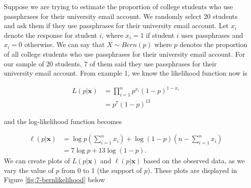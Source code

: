\documentclass[
]{book}
\begin{document}
Suppose we are trying to estimate the proportion of college students who use passphrases for their university email account. We randomly select 20 students and ask them if they use passphrases for their university email account. Let \(x_i\) denote the response for student \(i\), where \(x_i = 1\) if student \(i\) uses passphrases and \(x_i=0\) otherwise. We can say that \(X \sim Bern(p)\) where \(p\) denotes the proportion of all college students who use passphrases for their university email account. For our sample of 20 students, 7 of them said they use passphrases for their university email account. From example 1, we know the likelihood function now is

\[
\begin{split}
L(p | \boldsymbol{x} ) &= \prod_{i=1}^n p^{x_i} (1-p)^{1-x_i} \\
                       &= p^7 (1-p)^{13}
\end{split}
\]

and the log-likelihood function becomes

\[
\begin{split}
\ell (p | \boldsymbol{x}) &= \log p \left(\sum_{i=1}^n x_i \right) + \log (1-p) \left( n - \sum_{i=1}^n x_i \right)\\
                          &= 7 \log p + 13 \log(1-p).
\end{split}
\]
We can create plots of \(L(p | \boldsymbol{x} )\) and \(\ell(p | \boldsymbol{x} )\) based on the observed data, as we vary the value of \(p\) from 0 to 1 (the support of \(p\)). These plots are displayed in Figure \ref{fig:7-bernlikelihood} below
\end{document}
